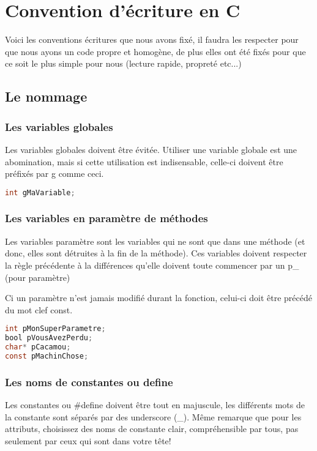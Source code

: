 \chapter{Convention d'écriture en C} \label{conventions}
Voici les conventions écritures que nous avons fixé, il faudra les respecter pour que nous ayons un code propre et homogène, de plus elles ont été fixés pour que ce soit le plus simple pour nous (lecture rapide, propreté etc...)

\section{Le nommage}
\subsection{Les variables globales}
Les variables globales doivent être évitée. Utiliser une variable globale est une abomination, mais si cette utilisation est indisensable, celle-ci doivent être préfixés par g comme ceci.

\begin{lstlisting}[language=C, caption=Exemples de noms de variable globale]
int gMaVariable;
\end{lstlisting}

\subsection{Les variables en paramètre de méthodes}
Les variables paramètre sont les variables qui ne sont que dans une méthode (et donc, elles sont détruites à la fin de la méthode). 
Ces variables doivent respecter la règle précédente à la différences qu'elle doivent toute commencer par un p\_ (pour paramètre)

Ci un paramètre n'est jamais modifié durant la fonction, celui-ci doit être précédé du mot clef const.

\begin{lstlisting}[language=C, caption=Exemples de noms de paramètres]
int pMonSuperParametre;
bool pVousAvezPerdu;
char* pCacamou;
const pMachinChose;
\end{lstlisting}

\subsection{Les noms de constantes ou define}
Les constantes ou \#define doivent être tout en majuscule, les différents mots de la constante sont séparés par des underscore (\_). Même remarque que pour les attributs,
choisissez des noms de constante clair, compréhensible par tous, pas seulement par ceux qui sont dans votre tête! 

